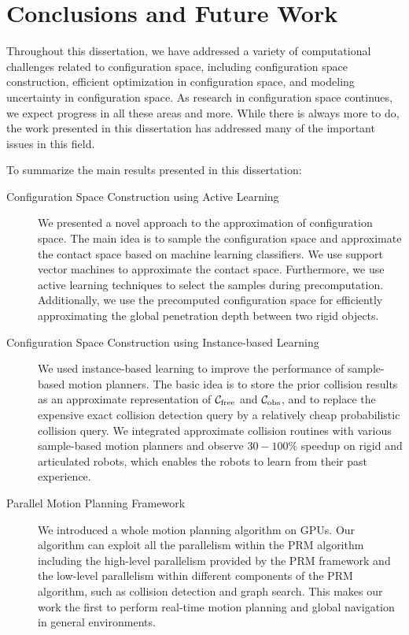 \chapter{Conclusions and Future Work}
\label{chp:Conclusion}
Throughout this dissertation, we have addressed a variety of computational challenges related to configuration space, including configuration space construction, efficient optimization in configuration space, and modeling uncertainty in configuration space. As research in configuration space continues, we expect progress in all these areas and more. While there is always more to do, the work presented in this dissertation has addressed many of the important issues in this field.

To summarize the main results presented in this dissertation:
\begin{description}
\item[Configuration Space Construction using Active Learning] We presented a novel approach to the approximation of configuration space. The main idea is to sample the configuration space and approximate the contact space based on machine learning classifiers. We use support vector machines to approximate the contact space. Furthermore, we use active learning techniques to select the samples during precomputation. Additionally, we use the precomputed configuration space for efficiently approximating the global penetration depth between two rigid objects.
\item[Configuration Space Construction using Instance-based Learning] We used instance-based learning to improve the performance of sample-based motion planners. The basic idea is to store the prior collision results as an approximate representation of $\mathcal C_{\text{free}}$ and $\mathcal C_{\text{obs}}$, and to replace the expensive exact collision detection query by a relatively cheap probabilistic collision query. We integrated approximate collision routines with various sample-based motion planners and observe $30-100\%$ speedup on rigid and articulated robots, which enables the robots to learn from their past experience.
\item[Parallel Motion Planning Framework] We introduced a whole motion planning algorithm on GPUs. Our algorithm can exploit all the parallelism within the PRM algorithm including the high-level parallelism provided by the PRM framework and the low-level parallelism within different components of the PRM algorithm, such as collision detection and graph search. This makes our work the first to perform real-time motion planning and global navigation in general environments.

\end{description}
